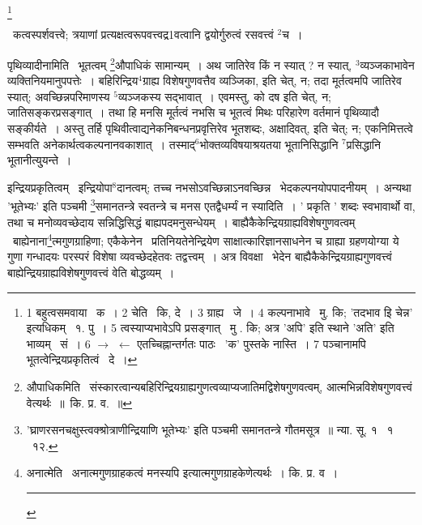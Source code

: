 \documentclass[11pt, openany]{book}
\newcommand\blfootnote[1]{%
 \begingroup
 \renewcommand\thefootnote{}\footnote{#1}%
 \addtocounter{footnote}{-1}%
 \endgroup
}
\begin{document}
\blfootnote{1 बहुत्वसमवाया  \textendash\ क~। 2 चेति  \textendash\ कि, दे~। 3 ग्राह्य  \textendash\ जे~। 4 कल्पनाभावे  \textendash\ मु. कि; 'तदभाव इि चेन्न' इत्यधिकम्  \textendash\ १. पु~। 5 त्वस्याप्यभावेऽपि प्रसङ्गात्  \textendash\ मु . कि; अत्र 'अपि' इति स्थाने 'अति' इति भाव्यम्  \textendash\ सं~। 6 $\rightarrow$ $\leftarrow$ एतच्चिह्नान्तर्गतः पाठः \textendash\ 'क' पुस्तके नास्ति~। 7 पञ्चानामपि भूतत्वेन्द्रियप्रकृतित्वं \textendash\ दे~।} 

\newpage
\indent
\hangindent=2cm {\knu \textendash\ कत्वस्पर्शवत्त्वे; त्रयाणां प्रत्यक्षत्वरूपवत्त्वद्र1वत्वानि द्वयोर्गुरुत्वं रसवत्त्वं ${}^2$च~।}

{\knu पृथिव्यादीना}मिति \textendash\ भूतत्वम् \renewcommand{\thefootnote}{१}\footnote{औपाधिकमिति \textendash\ संस्कारत्वान्यबहिरिन्द्रियग्राह्यगुणत्वव्याप्यजातिमद्विशेषगुणवत्वम्, आत्मभिन्नविशेषगुणवत्त्वं वेत्यर्थः~॥~कि. प्र. व.~॥}औपाधिकं सामान्यम्~। अथ जातिरेव किं न स्यात् ? न स्यात्, ${}^3$व्यञ्जकाभावेन व्यक्तिनियमानुपपत्तेः~। बहिरिन्द्रिय$^4$ग्राह्य विशेषगुणवत्तैव व्यञ्जिका, इति चेत्, न; तदा मूर्तत्वमपि जातिरेव स्यात्; अवच्छिन्नपरिमाणस्य ${}^5$व्यञ्जकस्य सद्भावात्~। एवमस्तु, को दष इति चेत्, न; जातिसङ्करप्रसङ्गात्~। तथा हि मनसि मूर्तत्वं नभसि च भूतत्वं मिथः परिहारेण वर्तमानं पृथिव्यादौ सङ्कीर्यते~। अस्तु तर्हि पृथिवीत्वाद्यनेकनिबन्धनप्रवृत्तिरेव भूतशब्दः, अक्षादिवत्, इति चेत्; न; एकनिमित्तत्वे सम्भवति अनेकार्थत्वकल्पनानवकाशात्~। तस्माद्$^6$भोक्तव्यविषयाश्रयतया भूतानिसिद्धानि ${}^7$प्रसिद्धानि भूतानीत्यु्यन्ते~।

{\knu इन्द्रियप्रकृतित्वम्} \textendash\ इन्द्रियोपा$^8$दानत्वम्; तच्च नभसोऽवच्छिन्नाऽनवच्छिन्न \textendash\ भेदकल्पनयोपपादनीयम्~। अन्यथा 'भूतेभ्यः' इति पञ्चमी \renewcommand{\thefootnote}{२}\footnote{'घ्राणरसनचक्षुस्त्वक्श्रोत्राणीन्द्रियाणि भूतेभ्यः' इति पञ्चमी समानतन्त्रे गौतमसूत्र~॥ न्या. सू. १ \textendash\ १ \textendash\ १२.}समानतन्त्रे स्वतन्त्रे च मनस एतद्वैधर्म्यं न स्यादिति~। ' प्रकृति ' शब्दः स्वभावार्थो वा, तथा च मनोव्यवच्छेदाय सन्निद्धिसिद्धं बाह्यपदमनुसन्धेयम्~। {\knu बाह्यैकैकेन्द्रियग्राह्यविशेषगुणवत्वम्} \textendash\ बाह्येनाना\renewcommand{\thefootnote}{३}\footnote{अनात्मेति \textendash\ अनात्मगुणग्राहकत्वं मनस्यपि इत्यात्मगुणग्राहकेणेत्यर्थः~। कि. प्र. व~।\\ \rule{0.4\linewidth}{0.5pt}}त्मगुणग्राहिणा; एकैकेनेन \textendash\ प्रतिनियतेनेन्द्रियेण साक्षात्कारिज्ञानसाधनेन च ग्राह्या ग्रहणयोग्या ये गुणा गन्धादयः परस्परं विशेषा व्यवच्छेदहेतवः तद्वत्त्वम्~। अत्र विवक्षा \textendash\ भेदेन बाह्यैकैकेन्द्रियग्राह्यगुणवत्त्वं बाह्येन्द्रियग्राह्यविशेषगुणवत्त्वं वेति बोद्धव्यम्~।
\end{document}
